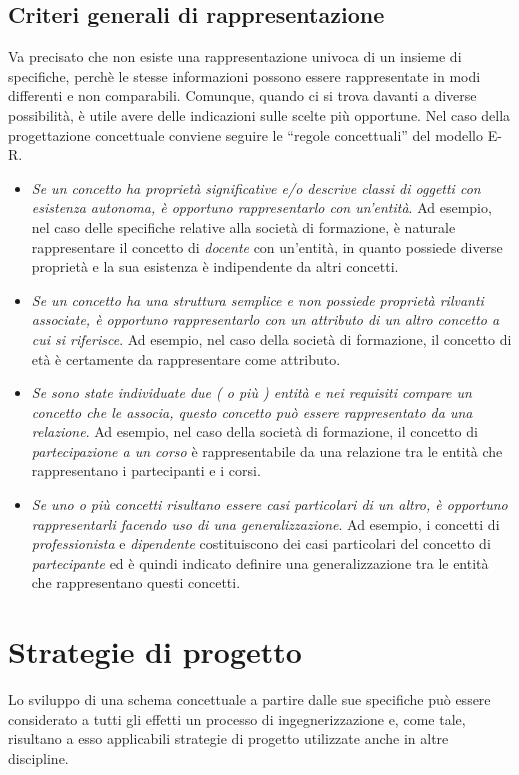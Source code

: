 \documentclass[12pt]{report}
\begin{document}
 	\subsection{Criteri generali di rappresentazione}
 	Va precisato che non esiste una rappresentazione univoca di un insieme di specifiche, perchè le stesse informazioni possono essere rappresentate in modi differenti e non comparabili. Comunque, quando ci si trova davanti a diverse possibilità, è utile avere delle indicazioni sulle scelte più opportune. Nel caso della progettazione concettuale conviene seguire le ``regole concettuali'' del modello E-R.
 	\begin{itemize}
 		\item \textit{Se un concetto ha proprietà significative e/o descrive classi di oggetti con esistenza autonoma, è opportuno rappresentarlo con un'entità}. Ad esempio, nel caso delle specifiche relative alla società di formazione, è naturale rappresentare il concetto di \textit{docente} con un'entità, in quanto possiede diverse proprietà e la sua esistenza è indipendente da altri concetti.
 		\item \textit{Se un concetto ha una struttura semplice e non possiede proprietà rilvanti associate, è opportuno rappresentarlo con un attributo di un altro concetto a cui si riferisce}. Ad esempio, nel caso della società di formazione, il concetto di età è certamente da rappresentare come attributo.
 		\item \textit{Se sono state individuate due ( o più ) entità e nei requisiti compare un concetto che le associa, questo concetto può essere rappresentato da una relazione}. Ad esempio, nel caso della società di formazione, il concetto di \textit{partecipazione a un corso} è rappresentabile da una relazione tra le entità che rappresentano i partecipanti e i corsi.
 		\item \textit{Se uno o più concetti risultano essere casi particolari di un altro, è opportuno rappresentarli facendo uso di una generalizzazione}. Ad esempio, i concetti di \textit{professionista} e \textit{dipendente} costituiscono dei casi particolari del concetto di \textit{partecipante} ed è quindi indicato definire una generalizzazione tra le entità che rappresentano questi concetti.
 	\end{itemize}
 	\section{Strategie di progetto}
 	Lo sviluppo di una schema concettuale a partire dalle sue specifiche può essere considerato a tutti gli effetti un processo di ingegnerizzazione e, come tale, risultano a esso applicabili strategie di progetto utilizzate anche in altre discipline.
\end{document}
